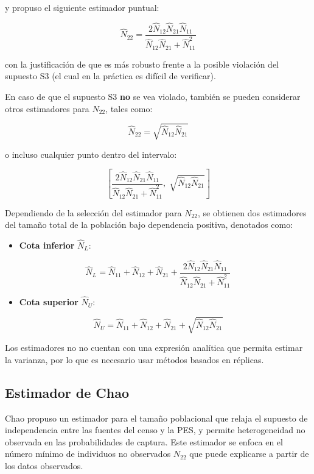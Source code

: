 \documentclass[
  12pt,
]{book}
\providecommand{\tightlist}{%
  \setlength{\itemsep}{0pt}\setlength{\parskip}{0pt}}
\begin{document}
y propuso el siguiente estimador puntual:

\[\hat{N}_{22} = \frac{2 \hat{N}_{12} \hat{N}_{21} \hat{N}_{11}}{\hat{N}_{12} \hat{N}_{21} + \hat{N}_{11}^2}\]

con la justificación de que es más robusto frente a la posible violación del supuesto S3 (el cual en la práctica es difícil de verificar).

En caso de que el supuesto S3 \textbf{no} se vea violado, también se pueden considerar otros estimadores para \(N_{22}\), tales como:

\[\hat{N}_{22} = \sqrt{\hat{N}_{12} \hat{N}_{21}}\]

o incluso cualquier punto dentro del intervalo:

\[\left[ \frac{2 \hat{N}_{12} \hat{N}_{21} \hat{N}_{11}}{\hat{N}_{12} \hat{N}_{21} + \hat{N}_{11}^2}, \; \sqrt{\hat{N}_{12} \hat{N}_{21}} \right]\]

Dependiendo de la selección del estimador para \(N_{22}\), se obtienen dos estimadores del tamaño total de la población bajo dependencia positiva, denotados como:

\begin{itemize}
\tightlist
\item
  \textbf{Cota inferior} \(\hat{N}_L\):
\end{itemize}

\[\hat{N}_L = \hat{N}_{11} + \hat{N}_{12} + \hat{N}_{21} + \frac{2 \hat{N}_{12} \hat{N}_{21} \hat{N}_{11}}{\hat{N}_{12} \hat{N}_{21} + \hat{N}_{11}^2}\]

\begin{itemize}
\tightlist
\item
  \textbf{Cota superior} \(\hat{N}_U\):
\end{itemize}

\[\hat{N}_U = \hat{N}_{11} + \hat{N}_{12} + \hat{N}_{21} + \sqrt{\hat{N}_{12} \hat{N}_{21}}\]

Los estimadores no no cuentan con una expresión analítica que permita estimar la varianza, por lo que es necesario usar métodos basados en réplicas.

\subsection{Estimador de Chao}\label{estimador-de-chao}

Chao \citep{chao1987, chao1989} propuso un estimador para el tamaño poblacional que relaja el supuesto de independencia entre las fuentes del censo y la PES, y permite heterogeneidad no observada en las probabilidades de captura. Este estimador se enfoca en el número mínimo de individuos no observados \(N_{22}\) que puede explicarse a partir de los datos observados.
\end{document}
